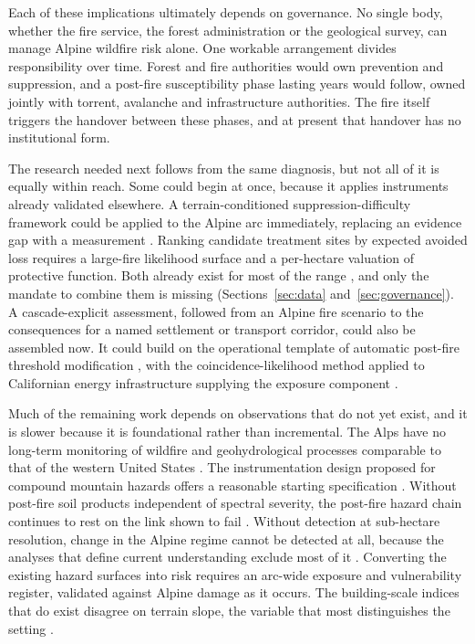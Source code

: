 \documentclass[11pt,a4paper]{article}
\begin{document}
Each of these implications ultimately depends on governance. No single body, whether the fire service, the forest administration or the geological survey, can manage Alpine wildfire risk alone. One workable arrangement divides responsibility over time. Forest and fire authorities would own prevention and suppression, and a post-fire susceptibility phase lasting years would follow, owned jointly with torrent, avalanche and infrastructure authorities. The fire itself triggers the handover between these phases, and at present that handover has no institutional form.

The research needed next follows from the same diagnosis, but not all of it is equally within reach. Some could begin at once, because it applies instruments already validated elsewhere. A terrain-conditioned suppression-difficulty framework could be applied to the Alpine arc immediately, replacing an evidence gap with a measurement \citep{cardil_assessing_2025}. Ranking candidate treatment sites by expected avoided loss requires a large-fire likelihood surface and a per-hectare valuation of protective function. Both already exist for most of the range \citep{conedera_linking_2024, accastello_asforesee_2019}, and only the mandate to combine them is missing (Sections~\ref{sec:data} and~\ref{sec:governance}). A cascade-explicit assessment, followed from an Alpine fire scenario to the consequences for a named settlement or transport corridor, could also be assembled now. It could build on the operational template of automatic post-fire threshold modification \citep{tiranti_wildfires_2021}, with the coincidence-likelihood method applied to Californian energy infrastructure supplying the exposure component \citep{moftakhari_increasing_2019}.

Much of the remaining work depends on observations that do not yet exist, and it is slower because it is foundational rather than incremental. The Alps have no long-term monitoring of wildfire and geohydrological processes comparable to that of the western United States \citep{melzner_wildfire-induced_2025}. The instrumentation design proposed for compound mountain hazards offers a reasonable starting specification \citep{baselt_compound_2026}. Without post-fire soil products independent of spectral severity, the post-fire hazard chain continues to rest on the link shown to fail \citep{negri_wildfire_2026}. Without detection at sub-hectare resolution, change in the Alpine regime cannot be detected at all, because the analyses that define current understanding exclude most of it \citep{beloiu_climatedriven_2026}. Converting the existing hazard surfaces into risk requires an arc-wide exposure and vulnerability register, validated against Alpine damage as it occurs. The building-scale indices that do exist disagree on terrain slope, the variable that most distinguishes the setting \citep{papathomakohle_towards_2025, papathomakohle_wildfire_2022}.
\end{document}

